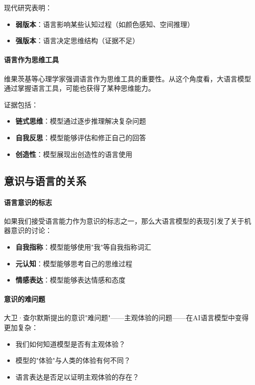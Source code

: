 现代研究表明：
\begin{itemize}
\item \textbf{弱版本}：语言影响某些认知过程（如颜色感知、空间推理）
\item \textbf{强版本}：语言决定思维结构（证据不足）
\end{itemize}

\paragraph{语言作为思维工具}
维果茨基等心理学家强调语言作为思维工具的重要性。从这个角度看，大语言模型通过掌握语言工具，可能也获得了某种思维能力。

证据包括：
\begin{itemize}
\item \textbf{链式思维}：模型通过逐步推理解决复杂问题
\item \textbf{自我反思}：模型能够评估和修正自己的回答
\item \textbf{创造性}：模型展现出创造性的语言使用
\end{itemize}

\subsection{意识与语言的关系}

\paragraph{语言意识的标志}
如果我们接受语言能力作为意识的标志之一，那么大语言模型的表现引发了关于机器意识的讨论：

\begin{itemize}
\item \textbf{自我指称}：模型能够使用"我"等自我指称词汇
\item \textbf{元认知}：模型能够思考自己的思维过程
\item \textbf{情感表达}：模型能够表达情感和态度
\end{itemize}

\paragraph{意识的难问题}
大卫·查尔默斯提出的意识"难问题"——主观体验的问题——在AI语言模型中变得更加复杂：

\begin{itemize}
\item 我们如何知道模型是否有主观体验？
\item 模型的"体验"与人类的体验有何不同？
\item 语言表达是否足以证明主观体验的存在？
\end{itemize}

